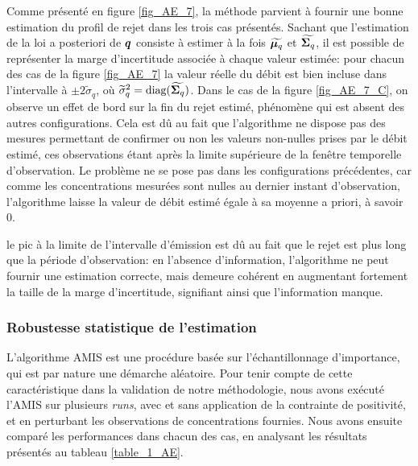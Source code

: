   Comme présenté en figure \ref{fig_AE_7}, la méthode parvient à fournir une bonne estimation du profil de rejet dans les trois cas présentés. Sachant que l'estimation de la loi a posteriori de ${\bm{q}}$ consiste à estimer à la fois ${\widetilde{\bm{\mu}_q}}$ et ${\widetilde{\bm{\Sigma}_q}}$, il est possible de représenter la marge d'incertitude associée à chaque valeur estimée: pour chacun des cas de la figure \ref{fig_AE_7} la valeur réelle du débit est bien incluse dans l'intervalle à $\pm 2\widetilde{\sigma}_q$, où $\widetilde{\sigma}_q^2 = \text{diag}({\widetilde{\bm{\Sigma}_q}})$. Dans le cas de la figure \ref{fig_AE_7_C}, {on observe un effet de bord sur la fin du rejet estimé, phénomène qui est absent des autres configurations. Cela est dû au fait que l'algorithme ne dispose pas des mesures permettant de confirmer ou non les valeurs non-nulles prises par le débit estimé, ces observations étant après la limite supérieure de la fenêtre temporelle d'observation. Le problème ne se pose pas dans les configurations précédentes, car comme les concentrations mesurées sont nulles au dernier instant d'observation, l'algorithme laisse la valeur de débit estimé égale à sa moyenne a priori, à savoir 0.}
  
  
  le pic à la limite de l'intervalle d'émission est dû au fait que le rejet est plus long que la période d'observation: en l'absence d'information, l'algorithme ne peut fournir une estimation correcte, mais demeure cohérent  en augmentant fortement la taille de la marge d'incertitude, signifiant ainsi que l'information manque. \\
  
  \subsubsection{Robustesse statistique de l'estimation}
    
    L'algorithme AMIS est une procédure basée sur l'échantillonnage d'importance, qui est par nature une démarche aléatoire. Pour tenir compte de cette caractéristique dans la validation de notre méthodologie, nous avons exécuté l'AMIS sur plusieurs \textit{runs}, avec et sans application de la contrainte de positivité, et en perturbant les observations de concentrations fournies. Nous avons ensuite comparé les performances dans chacun des cas, en analysant les résultats présentés au tableau \ref{table_1_AE}. 
    
